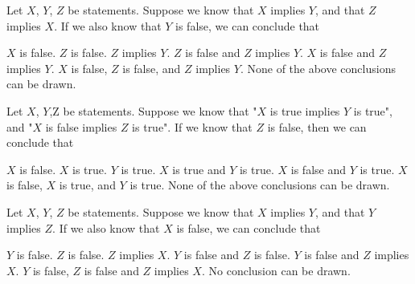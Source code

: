 \documentclass[twoside,a4paper,leqno]{article}
\begin{document}
\begin{esercizi*}{}
\begin{exerm}
\begin{varianti}
\varitem 
  Let $X$, $Y$, $Z$ be statements.  Suppose we know that $X$ implies $Y$, and that $Z$ implies $X$.  If we also know that $Y$ is false, we can conclude that
\begin{rispm}
\risp  $X$ is false.
\risp  $Z$ is false.
\risp  $Z$ implies $Y$.
\risp  $Z$ is false and  $Z$ implies $Y$.
\risp  $X$ is false  and  $Z$ implies $Y$.
\risp[=]  $X$ is false, $Z$ is false, and $Z$ implies $Y$.  
\risp  None of the above conclusions can be drawn.
\end{rispm}
\varitem 
  Let $X$, $Y$,Z be statements.  Suppose we know that "$X$ is true implies $Y$ is true", and "$X$ is false implies $Z$ is true".  If we know that $Z$ is false, then we can conclude that
\begin{rispm}
\risp  $X$ is false.
\risp  $X$ is true.
\risp  $Y$ is true.
\risp[=]  $X$ is true and  $Y$ is true.
\risp  $X$ is false and $Y$ is true.
\risp  $X$ is false, $X$ is true, and $Y$ is true.  
\risp  None of the above conclusions can be drawn.
\end{rispm}

\varitem 
Let $X$, $Y$, $Z$ be statements.  Suppose we know that $X$ implies $Y$, and that $Y$ implies $Z$.  If we also know that $X$ is false, we can conclude that
\begin{rispm}
\risp  $Y$ is false.
\risp  $Z$ is false.
\risp  $Z$ implies $X$.
\risp  $Y$ is false and  $Z$ is false.
\risp  $Y$ is false and $Z$ implies $X$.
\risp  $Y$ is false, $Z$ is false and $Z$ implies $X$.  
\risp[=]  No conclusion can be drawn.
\end{rispm}
\end{varianti}
\end{exerm}


\end{esercizi*}
\end{document}
